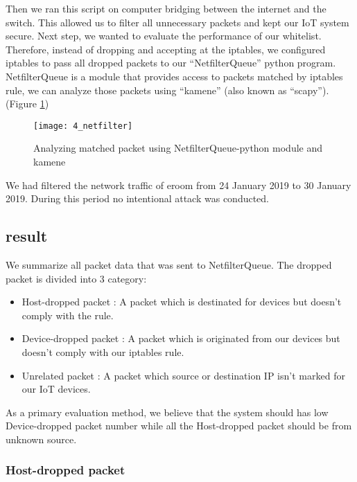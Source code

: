 Then we ran this script on computer bridging between the internet and the switch. This allowed us to filter all unnecessary packets and kept our IoT system secure. 
Next step, we wanted to evaluate the performance of our whitelist. 
Therefore, instead of dropping and accepting at the iptables, we configured iptables to pass all dropped packets to our “NetfilterQueue” python program. NetfilterQueue is a module that provides access to packets matched by iptables rule, we can analyze those packets using “kamene” (also known as “scapy”).
(Figure \ref{fig:s4_netfilter})

\begin{figure}[h]
    \centering 
    \texttt{[image: 4\_netfilter]} 
    \caption{Analyzing matched packet using NetfilterQueue-python module and kamene}
    \label{fig:s4_netfilter}
\end{figure} 

We had filtered the network traffic of eroom from 24 January 2019 to 30 January 2019. 
During this period no intentional attack was conducted.

\subsection{result}
We summarize all packet data that was sent to NetfilterQueue.
The dropped packet is divided into 3 category: 
\begin{itemize}
    \item Host-dropped packet : A packet which is destinated for devices but doesn't comply with the rule.
    \item Device-dropped packet : A packet which is originated from our devices but doesn't comply with our iptables rule.
    \item Unrelated packet : A packet which source or destination IP isn't marked for our IoT devices.
\end{itemize}
As a primary evaluation method, we believe that the system should has low Device-dropped packet number
while all the Host-dropped packet should be from unknown source.

\newpage 

\subsubsection{Host-dropped packet}  
 
